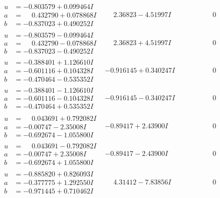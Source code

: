 \documentclass[1p]{elsarticle_modified}
\theoremstyle{definition}
\begin{document}
$$\begin{array}{c|c|c}
\begin{aligned}
u &= -0.803579 + 0.099464 I \\
a &= \phantom{-}0.432790 + 0.078868 I \\
b &= -0.837023 + 0.490252 I\end{aligned}
 & \phantom{-}2.36823 - 4.51997 I & \phantom{-0.000000 } 0 \\ \hline\begin{aligned}
u &= -0.803579 - 0.099464 I \\
a &= \phantom{-}0.432790 - 0.078868 I \\
b &= -0.837023 - 0.490252 I\end{aligned}
 & \phantom{-}2.36823 + 4.51997 I & \phantom{-0.000000 } 0 \\ \hline\begin{aligned}
u &= -0.388401 + 1.126610 I \\
a &= -0.601116 + 0.104328 I \\
b &= -0.470464 - 0.535352 I\end{aligned}
 & -0.916145 + 0.340247 I & \phantom{-0.000000 } 0 \\ \hline\begin{aligned}
u &= -0.388401 - 1.126610 I \\
a &= -0.601116 - 0.104328 I \\
b &= -0.470464 + 0.535352 I\end{aligned}
 & -0.916145 - 0.340247 I & \phantom{-0.000000 } 0 \\ \hline\begin{aligned}
u &= \phantom{-}0.043691 + 0.792082 I \\
a &= -0.00747 - 2.35008 I \\
b &= -0.692674 - 1.055800 I\end{aligned}
 & -0.89417 + 2.43900 I & \phantom{-0.000000 } 0 \\ \hline\begin{aligned}
u &= \phantom{-}0.043691 - 0.792082 I \\
a &= -0.00747 + 2.35008 I \\
b &= -0.692674 + 1.055800 I\end{aligned}
 & -0.89417 - 2.43900 I & \phantom{-0.000000 } 0 \\ \hline\begin{aligned}
u &= -0.885820 + 0.826093 I \\
a &= -0.377775 + 1.292550 I \\
b &= -0.971445 + 0.710462 I\end{aligned}
 & \phantom{-}4.31412 - 7.83856 I & \phantom{-0.000000 } 0 \\ \hline\begin{aligned}

\end{aligned}
\end{array}$$
\end{document}
